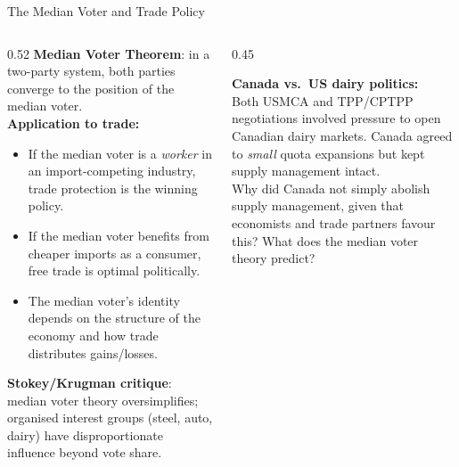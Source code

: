 \documentclass[aspectratio=169]{beamer}
\begin{document}
\begin{frame}{The Median Voter and Trade Policy}
\begin{columns}
\begin{column}{0.52\textwidth}
\textbf{Median Voter Theorem}: in a two-party system, both parties converge to the position of the median voter.\\[0.3em]
\textbf{Application to trade:}
\begin{itemize}
  \item If the median voter is a \emph{worker} in an import-competing industry, trade protection is the winning policy.
  \item If the median voter benefits from cheaper imports as a consumer, free trade is optimal politically.
  \item The median voter's identity depends on the structure of the economy and how trade distributes gains/losses.
\end{itemize}
\vspace{0.2em}
\textbf{Stokey/Krugman critique}: median voter theory oversimplifies; organised interest groups (steel, auto, dairy) have disproportionate influence beyond vote share.
\end{column}
\begin{column}{0.45\textwidth}
\begin{discuss}
  \textbf{Canada vs.\ US dairy politics:}\\[0.2em]
  Both USMCA and TPP/CPTPP negotiations involved pressure to open Canadian dairy markets. Canada agreed to \emph{small} quota expansions but kept supply management intact.\\[0.3em]
  Why did Canada not simply abolish supply management, given that economists and trade partners favour this? What does the median voter theory predict?
\end{discuss}
\end{column}
\end{columns}
\end{frame}
\end{document}
